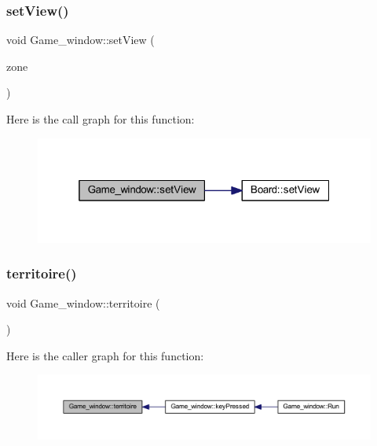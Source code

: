 \subsubsection{\texorpdfstring{set\+View()}{setView()}}
{\footnotesize\ttfamily void Game\+\_\+window\+::set\+View (\begin{DoxyParamCaption}\item[{const sf\+::\+Float\+Rect \&}]{zone }\end{DoxyParamCaption})}

Here is the call graph for this function\+:\nopagebreak
\begin{figure}[H]
\begin{center}
\leavevmode
\includegraphics[width=319pt]{class_game__window_a5d130eb03ee63de5d63f91bcf6c56fa5_cgraph}
\end{center}
\end{figure}
\mbox{\label{class_game__window_a8ad36b6ebe4760954dd01e94fc5762f1}} 
\subsubsection{\texorpdfstring{territoire()}{territoire()}}
{\footnotesize\ttfamily void Game\+\_\+window\+::territoire (\begin{DoxyParamCaption}{ }\end{DoxyParamCaption})}

Here is the caller graph for this function\+:\nopagebreak
\begin{figure}[H]
\begin{center}
\leavevmode
\includegraphics[width=350pt]{class_game__window_a8ad36b6ebe4760954dd01e94fc5762f1_icgraph}
\end{center}
\end{figure}
\mbox{\label{class_game__window_a9b9b15469cb0ced1a22f28e447983b56}} 
